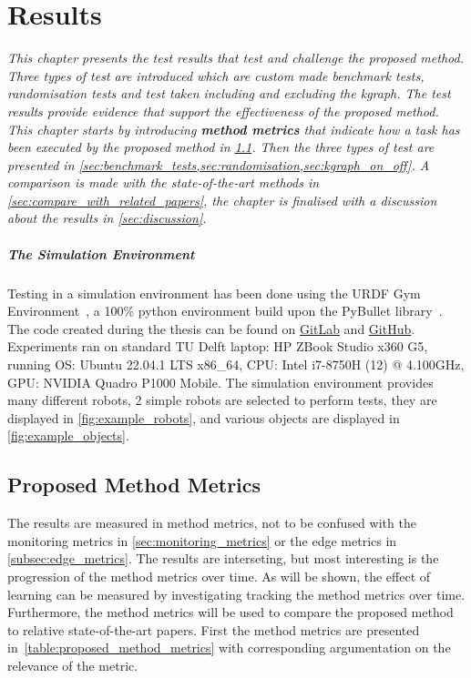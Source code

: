 \chapter{Results}%
\label{chap:results}
\textit{This chapter presents the test results that test and challenge the proposed method. Three types of test are introduced which are custom made benchmark tests, randomisation tests and test taken including and excluding the \ac{kgraph}. The test results provide evidence that support the effectiveness of the proposed method. This chapter starts by introducing \textbf{method metrics} that indicate how a task has been executed by the proposed method in \cref{sec:proposed_method_metrics}. Then the three types of test are presented in \cref{sec:benchmark_tests,sec:randomisation,sec:kgraph_on_off}. A comparison is made with the state-of-the-art methods in \cref{sec:compare_with_related_papers}, the chapter is finalised with a discussion about the results in \cref{sec:discussion}.\bs}

\paragraph{The Simulation Environment}
Testing in a simulation environment has been done using the URDF Gym Environment~\cite{spahn_urdfenvironment_2022}, a 100\% python environment build upon the PyBullet library~\cite{coumans_pybullet_2016}. The code created during the thesis can be found on \href{https://gitlab.tudelft.nl/airlab-delft/msc_projects/msc_gijs_groote}{GitLab} and \href{https://github.com/GijsGroote/semantic-thinking-robot}{GitHub}. Experiments ran on standard TU Delft laptop: HP ZBook Studio x360 G5, running OS: Ubuntu 22.04.1 LTS x86\_64, CPU: Intel i7-8750H (12) @ 4.100GHz, GPU: NVIDIA Quadro P1000 Mobile.\bs
The simulation environment provides many different robots, 2 simple robots are selected to perform tests, they are displayed in \cref{fig:example_robots}, and various objects are displayed in \cref{fig:example_objects}.



\section{Proposed Method Metrics}%
\label{sec:proposed_method_metrics}
The results are measured in method metrics, not to be confused with the monitoring metrics in \cref{sec:monitoring_metrics} or the edge metrics in \cref{subsec:edge_metrics}. The results are interseting, but most interesting is the progression of the method metrics over time. As will be shown, the effect of learning can be measured by investigating tracking the method metrics over time. Furthermore, the method metrics will be used to compare the proposed method to relative state-of-the-art papers. First the method metrics are presented in~\cref{table:proposed_method_metrics} with corresponding argumentation on the relevance of the metric.\bs



